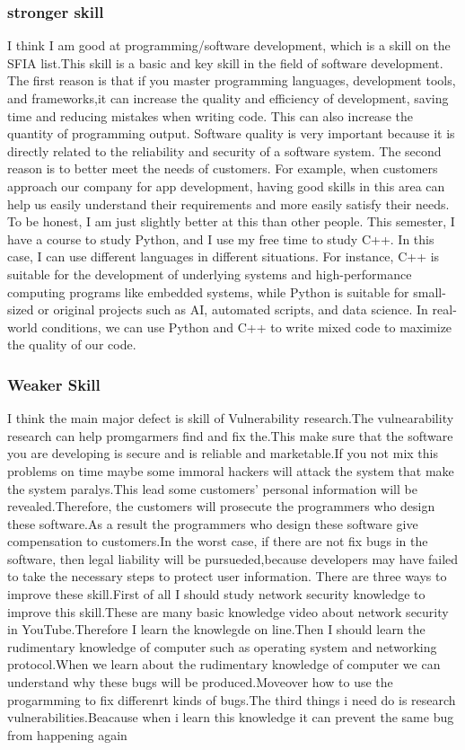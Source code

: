 \documentclass[a4paper, 11pt]{report}
\begin{document}
\subsubsection{stronger skill}
	I think I am good at programming/software development, which is a skill on the SFIA list.This skill is a basic and key skill in the field of software development.
The first reason is that if you master programming languages, development tools, and frameworks,it can increase the quality and efficiency of development, saving time and reducing mistakes when writing code. This can also increase the quantity of programming output. Software quality is very important because it is directly related to the reliability and security of a software system. 
	The second reason is to better meet the needs of customers. For example, when customers approach our company for app development, having good skills in this area can help us easily understand their requirements and more easily satisfy their needs. 
To be honest, I am just slightly better at this than other people. This semester, I have a course to study Python, and I use my free time to study C++. In this case, I can use different languages in different situations. For instance, C++ is suitable for the development of underlying systems and high-performance computing programs like embedded systems, while Python is suitable for small-sized or original projects such as AI, automated scripts, and data science. In real-world conditions, we can use Python and C++ to write mixed code to maximize the quality of our code.
\subsubsection{Weaker Skill}
I think the main major defect is skill of Vulnerability research.The vulnearability research can help promgarmers find and fix the.This make sure that the software you are developing is secure and is reliable and marketable.If you not mix this problems on time maybe some immoral hackers will attack the system that make the system paralys.This lead some customers' personal information will be revealed.Therefore, the customers will prosecute the programmers who design these software.As a result the programmers who design these software give compensation to customers.In the worst case, if there are not fix bugs in the software, then legal liability will be pursueded,because developers may have failed to take the necessary steps to protect user information. 
	There are three ways to improve these skill.First of all I should study network security knowledge to improve this skill.These are many basic knowledge video about network security in 	YouTube.Therefore I learn the knowlegde on line.Then I should learn the rudimentary knowledge of computer such as operating system
and networking protocol.When we learn about the rudimentary knowledge of computer we can understand why these bugs will be produced.Moveover how to use the progarmming to fix differenrt kinds of bugs.The third things i need do is research vulnerabilities.Beacause when i learn this knowledge it can prevent the same bug from happening again 
\end{document}

